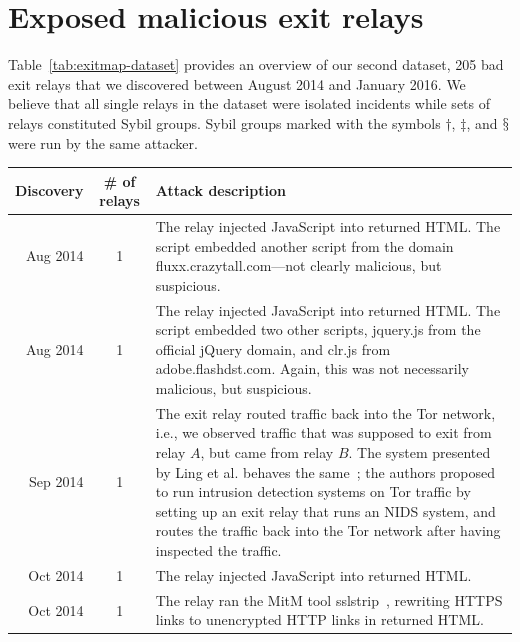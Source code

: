 \appendix

\section{Exposed malicious exit relays}
\label{sec:malicious-relays}
Table~\ref{tab:exitmap-dataset} provides an overview of our second dataset, 205
bad exit relays that we discovered between August 2014 and January 2016.  We
believe that all single relays in the dataset were isolated incidents while sets
of relays constituted Sybil groups.  Sybil groups marked with the symbols
$\dagger$, $\ddagger$, and $\mathsection$ were run by the same attacker.

\begin{table}[t]
\small
\centering
\begin{tabular}{r c p{10cm}}
\hline
\textbf{Discovery} & \textbf{\# of relays} & \textbf{Attack description} \\
\hline
Aug 2014 & 1 & The relay injected JavaScript into returned HTML.  The script
embedded another script from the domain fluxx.crazytall.com---not clearly
malicious, but suspicious. \\

Aug 2014 & 1 & The relay injected JavaScript into returned HTML.  The script
embedded two other scripts, jquery.js from the official jQuery domain, and
clr.js from adobe.flashdst.com.  Again, this was not necessarily malicious, but
suspicious. \\

Sep 2014 & 1 & The exit relay routed traffic back into the Tor network, i.e., we
observed traffic that was supposed to exit from relay $A$, but came from relay
$B$.  The system presented by Ling et al. behaves the same~\cite{Ling2015a};
the authors proposed to run intrusion detection systems on Tor traffic by
setting up an exit relay that runs an NIDS system, and routes the traffic back
into the Tor network after having inspected the traffic. \\

Oct 2014 & 1 & The relay injected JavaScript into returned HTML. \\

Oct 2014 & 1 & The relay ran the MitM tool sslstrip~\cite{sslstrip}, rewriting
HTTPS links to unencrypted HTTP links in returned HTML. \\


\end{tabular}
\end{table}
